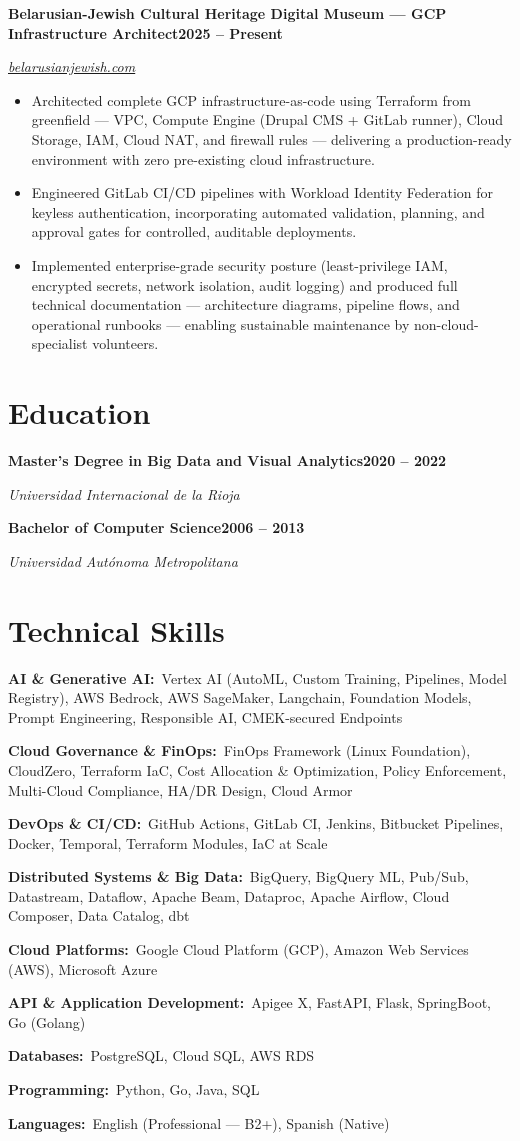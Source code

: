 \documentclass[11pt,letterpaper]{article}
\newcommand{\job}[3]{%
  \par\vspace{4pt}%
  \noindent\textbf{#1}\hfill\textbf{#3}%
  \par\vspace{1pt}\noindent\textit{#2}%
  \par\vspace{1pt}%
}
\newcommand{\row}[2]{\par\noindent\textbf{#1:}\ #2\par\vspace{1.5pt}}
\begin{document}
\job{Belarusian-Jewish Cultural Heritage Digital Museum --- GCP Infrastructure Architect}{\href{https://belarusianjewish.com}{belarusianjewish.com}}{2025 -- Present}
\begin{itemize}
    \item Architected complete GCP infrastructure-as-code using Terraform from greenfield --- VPC, Compute Engine (Drupal CMS + GitLab runner), Cloud Storage, IAM, Cloud NAT, and firewall rules --- delivering a production-ready environment with zero pre-existing cloud infrastructure.
    \item Engineered GitLab CI/CD pipelines with Workload Identity Federation for keyless authentication, incorporating automated validation, planning, and approval gates for controlled, auditable deployments.
    \item Implemented enterprise-grade security posture (least-privilege IAM, encrypted secrets, network isolation, audit logging) and produced full technical documentation --- architecture diagrams, pipeline flows, and operational runbooks --- enabling sustainable maintenance by non-cloud-specialist volunteers.
\end{itemize}

\section{Education}
\job{Master's Degree in Big Data and Visual Analytics}{Universidad Internacional de la Rioja}{2020 -- 2022}
\job{Bachelor of Computer Science}{Universidad Aut\'onoma Metropolitana}{2006 -- 2013}

\section{Technical Skills}
\row{AI \& Generative AI}{Vertex AI (AutoML, Custom Training, Pipelines, Model Registry), AWS Bedrock, AWS SageMaker, Langchain, Foundation Models, Prompt Engineering, Responsible AI, CMEK-secured Endpoints}
\row{Cloud Governance \& FinOps}{FinOps Framework (Linux Foundation), CloudZero, Terraform IaC, Cost Allocation \& Optimization, Policy Enforcement, Multi-Cloud Compliance, HA/DR Design, Cloud Armor}
\row{DevOps \& CI/CD}{GitHub Actions, GitLab CI, Jenkins, Bitbucket Pipelines, Docker, Temporal, Terraform Modules, IaC at Scale}
\row{Distributed Systems \& Big Data}{BigQuery, BigQuery ML, Pub/Sub, Datastream, Dataflow, Apache Beam, Dataproc, Apache Airflow, Cloud Composer, Data Catalog, dbt}
\row{Cloud Platforms}{Google Cloud Platform (GCP), Amazon Web Services (AWS), Microsoft Azure}
\row{API \& Application Development}{Apigee X, FastAPI, Flask, SpringBoot, Go (Golang)}
\row{Databases}{PostgreSQL, Cloud SQL, AWS RDS}
\row{Programming}{Python, Go, Java, SQL}
\row{Languages}{English (Professional --- B2+), Spanish (Native)}
\end{document}
